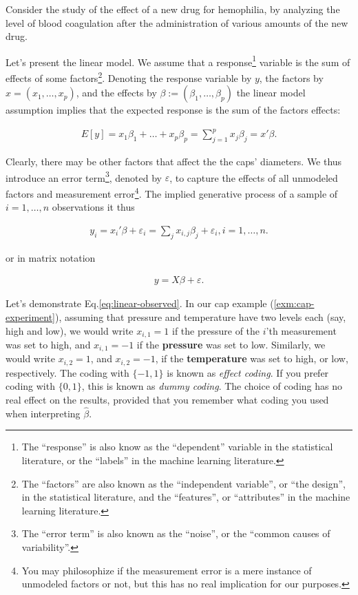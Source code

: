 \documentclass[]{book}
\theoremstyle{definition}
\theoremstyle{definition}
\theoremstyle{definition}
\theoremstyle{remark}
\let\BeginKnitrBlock\begin \let\EndKnitrBlock\end
\begin{document}
\BeginKnitrBlock{example}[Drug Effect]
\protect\hypertarget{exm:unnamed-chunk-148}{}{\label{exm:unnamed-chunk-148}
{} }Consider the study of the effect of a new
drug for hemophilia, by analyzing the level of blood coagulation after
the administration of various amounts of the new drug.
\EndKnitrBlock{example}

Let's present the linear model. We assume that a response\footnote{The
  ``response'' is also know as the ``dependent'' variable in the
  statistical literature, or the ``labels'' in the machine learning
  literature.} variable is the sum of effects of some factors\footnote{The
  ``factors'' are also known as the ``independent variable'', or ``the
  design'', in the statistical literature, and the ``features'', or
  ``attributes'' in the machine learning literature.}. Denoting the
response variable by \(y\), the factors by \(x=(x_1,\dots,x_p)\), and
the effects by \(\beta:=(\beta_1,\dots,\beta_p)\) the linear model
assumption implies that the expected response is the sum of the factors
effects:

\begin{align}
  E[y]=x_1 \beta_1 + \dots + x_p \beta_p = \sum_{j=1}^p x_j \beta_j = x'\beta .
  \label{eq:linear-mean}
\end{align}

Clearly, there may be other factors that affect the the caps' diameters.
We thus introduce an error term\footnote{The ``error term'' is also
  known as the ``noise'', or the ``common causes of variability''.},
denoted by \(\varepsilon\), to capture the effects of all unmodeled
factors and measurement error\footnote{You may philosophize if the
  measurement error is a mere instance of unmodeled factors or not, but
  this has no real implication for our purposes.}. The implied
generative process of a sample of \(i=1,\dots,n\) observations it thus

\begin{align}
  y_i = x_i'\beta + \varepsilon_i = \sum_j x_{i,j} \beta_j + \varepsilon_i , i=1,\dots,n .
  \label{eq:linear-observed}
\end{align}

or in matrix notation

\begin{align}
  y = X \beta + \varepsilon .
  \label{eq:linear-matrix}
\end{align}

Let's demonstrate Eq.\eqref{eq:linear-observed}. In our cap example
(\ref{exm:cap-experiment}), assuming that pressure and temperature have
two levels each (say, high and low), we would write \(x_{i,1}=1\) if the
pressure of the \(i\)'th measurement was set to high, and \(x_{i,1}=-1\)
if the \textbf{pressure} was set to low. Similarly, we would write
\(x_{i,2}=1\), and \(x_{i,2}=-1\), if the \textbf{temperature} was set
to high, or low, respectively. The coding with \(\{-1,1\}\) is known as
\emph{effect coding}. If you prefer coding with \(\{0,1\}\), this is
known as \emph{dummy coding}. The choice of coding has no real effect on
the results, provided that you remember what coding you used when
interpreting \(\hat \beta\).
\end{document}
